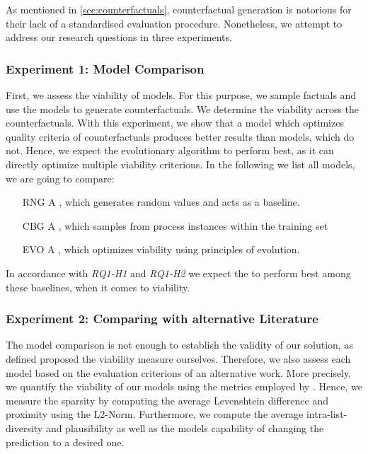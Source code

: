 \documentclass[./../../paper.tex]{subfiles}
\begin{document}
As mentioned in \autoref{sec:counterfactuals}, counterfactual generation is notorious for their lack of a standardised evaluation procedure. Nonetheless, we attempt to address our research questions in three experiments.

\subsubsection{Experiment 1: Model Comparison}
First, we assess the viability of  models. For this purpose, we sample  factuals and use the models to generate  counterfactuals. We determine the  viability across the counterfactuals. With this experiment, we show that a model which optimizes quality criteria of counterfactuals produces better results than models, which do not. Hence, we expect the evolutionary algorithm to perform best, as it can directly optimize multiple viability criterions. In the following we list all models, we are going to compare:

\begin{enumerate}
    \item[RNG] A \ModelRNG, which generates random values and acts as a baseline. 
    \item[CBG] A \ModelCBG, which samples from process instances within the training set
    \item[EVO] A \ModelEVOFSR, which optimizes viability using principles of evolution.
\end{enumerate}

In accordance with \emph{RQ1-H1} and \emph{RQ1-H2} we expect the \ModelEVOFSR to perform best among these baselines, when it comes to viability.

\subsubsection{Experiment 2: Comparing with alternative Literature}
The model comparison is not enough to establish the validity of our solution, as defined proposed the viability measure ourselves. Therefore, we also assess each model based on the evaluation criterions of an alternative work. More precisely, we quantify the viability of our models using the metrics employed by \citeauthor{hsieh_DiCE4ELInterpretingProcess_2021}. Hence, we measure the sparsity by computing the average Levenshtein difference and proximity using the L2-Norm. Furthermore, we compute the average intra-list-diversity and plausibility as well as the models capability of changing the prediction to a desired one. 
\end{document}
